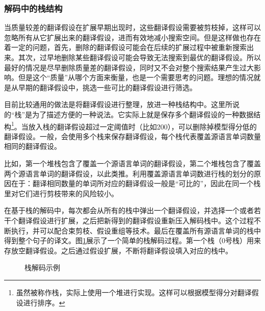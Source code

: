 
\subsubsection{解码中的栈结构}

\parinterval 当质量较差的翻译假设在扩展早期出现时，这些翻译假设需要被剪枝掉，这样可以忽略所有从它扩展出来的翻译假设，进而有效地减小搜索空间。但是这样做也存在着一定的问题，首先，删除的翻译假设可能会在后续的扩展过程中被重新搜索出来。其次，过早地删除某些翻译假设可能会导致无法搜索到最优的翻译假设。所以最好的情况是尽早删除质量差的翻译假设，同时又不会对整个搜索结果产生过大影响。但是这个``质量''从哪个方面来衡量，也是一个需要思考的问题。理想的情况就是从早期的翻译假设中，挑选一些可比的翻译假设进行筛选。

\parinterval 目前比较通用的做法是将翻译假设进行整理，放进一种栈结构中。这里所说的``栈''是为了描述方便的一种说法。它实际上就是保存多个翻译假设的一种数据结构\footnote[4]{虽然被称作栈，实际上使用一个堆进行实现。这样可以根据模型得分对翻译假设进行排序。}。当放入栈的翻译假设超过一定阈值时（比如200），可以删除掉模型得分低的翻译假设。一般，会使用多个栈来保存翻译假设，每个栈代表覆盖源语言单词数量相同的翻译假设。

\parinterval 比如，第一个堆栈包含了覆盖一个源语言单词的翻译假设，第二个堆栈包含了覆盖两个源语言单词的翻译假设，以此类推。利用覆盖源语言单词数进行栈的划分的原因在于：翻译相同数量的单词所对应的翻译假设一般是``可比的''，因此在同一个栈里对它们进行剪枝带来的风险较小。

\parinterval 在基于栈的解码中，每次都会从所有的栈中弹出一个翻译假设，并选择一个或者若干个翻译假设进行扩展，之后把新得到的翻译假设重新压入解码栈中。这个过程不断执行，并可以配合束剪枝、假设重组等技术。最后在覆盖所有源语言单词的栈中得到整个句子的译文。图\ref{fig:4-30}展示了一个简单的栈解码过程。第一个栈（0号栈）用来存放空翻译假设。之后通过假设扩展，不断将翻译假设填入对应的栈中。

\begin{figure}[htp]
\centering

\caption{栈解码示例}
\label{fig:4-30}
\end{figure}


